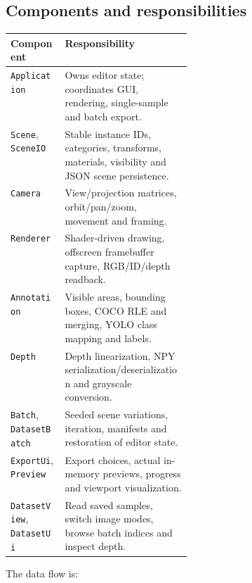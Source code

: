 \documentclass[12pt,a4paper]{article}
\newcommand{\code}[1]{{\small\nolinkurl{#1}}}
\begin{document}
\subsection{Components and responsibilities}
\noindent\noindent\begin{tabularx}{\linewidth}{@{}p{0.30\linewidth}X@{}}
\toprule Component & Responsibility\\\midrule
\code{Application} & Owns editor state; coordinates GUI, rendering, single-sample and batch export.\\
\code{Scene}, \code{SceneIO} & Stable instance IDs, categories, transforms, materials, visibility and JSON scene persistence.\\
\code{Camera} & View/projection matrices, orbit/pan/zoom, movement and framing.\\
\code{Renderer} & Shader-driven drawing, offscreen framebuffer capture, RGB/ID/depth readback.\\
\code{Annotation} & Visible areas, bounding boxes, COCO RLE and merging, YOLO class mapping and labels.\\
\code{Depth} & Depth linearization, NPY serialization/deserialization and grayscale conversion.\\
\code{Batch}, \code{DatasetBatch} & Seeded scene variations, iteration, manifests and restoration of editor state.\\
\code{ExportUi}, \code{Preview} & Export choices, actual in-memory previews, progress and viewport visualization.\\
\code{DatasetView}, \code{DatasetUi} & Read saved samples, switch image modes, browse batch indices and inspect depth.\\
\bottomrule
\end{tabularx}

The data flow is:
\begin{center}
\end{center}
\end{document}
